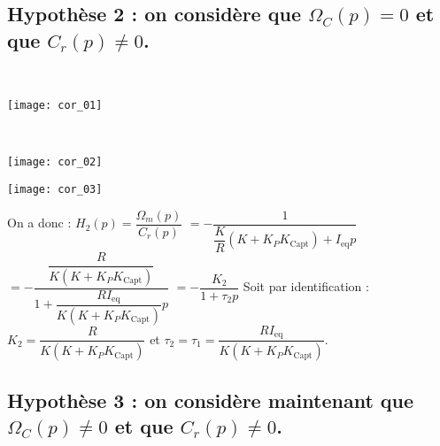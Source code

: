 \begin{multicols}{2}
\begin{corrige}
\end{corrige}
\else

\fi






\subsection*{Hypothèse 2 : on considère que $\Omega_C (p)=0$ et que $C_r (p)\neq0$.}
\ifprof
\begin{corrige}
~\\

\begin{center}
\texttt{[image: cor\_01]}
\end{center}
\end{corrige}
\else
\fi


\ifprof
\begin{corrige}
~\\

\begin{center}
\texttt{[image: cor\_02]}
\end{center}
\begin{center}
\texttt{[image: cor\_03]}
\end{center}
On a donc :	
$H_2 (p)=\dfrac{\Omega_m (p)}{C_r (p)}$
$=-\dfrac{1}{\dfrac{K}{R} \left(K+K_P K_{\text{Capt}} \right)+I_{\text{eq}} p}$
$=-\dfrac{\dfrac{R}{K \left(K+K_P  K_{\text{Capt}} \right) }}{1+\dfrac{R I_{\text{eq}}}{K \left(K+K_P K_{\text{Capt}} \right) } p}$
$=-\dfrac{K_2}{1+\tau_2 p}$
Soit par identification : $K_2=\dfrac{R}{K \left(K+K_P  K_{\text{Capt}} \right) }$	et	$\tau_2=\tau_1=\dfrac{R I_{\text{eq}}}{K (K+K_P K_{\text{Capt}} ) }$.





\end{corrige}
\else
\fi


\subsection*{Hypothèse 3 : on considère maintenant que  $\Omega_C (p)\neq 0$ et que $C_r (p)\neq 0$.}
\ifprof
\begin{corrige}


\end{corrige}
\end{multicols}
